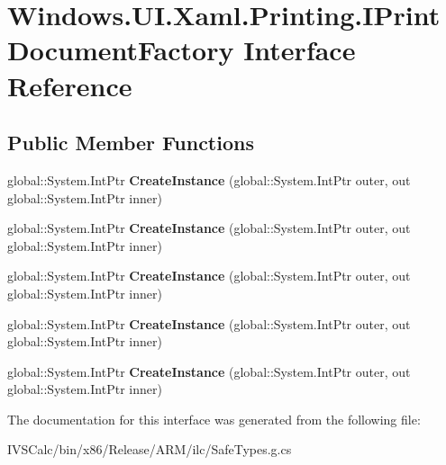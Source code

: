 \hypertarget{interface_windows_1_1_u_i_1_1_xaml_1_1_printing_1_1_i_print_document_factory}{}\section{Windows.\+U\+I.\+Xaml.\+Printing.\+I\+Print\+Document\+Factory Interface Reference}
\label{interface_windows_1_1_u_i_1_1_xaml_1_1_printing_1_1_i_print_document_factory}
\subsection*{Public Member Functions}
\begin{DoxyCompactItemize}
\item 
\mbox{\label{interface_windows_1_1_u_i_1_1_xaml_1_1_printing_1_1_i_print_document_factory_a1629d351c5c4974d5fed7ac601147821}} 
global\+::\+System.\+Int\+Ptr {\bfseries Create\+Instance} (global\+::\+System.\+Int\+Ptr outer, out global\+::\+System.\+Int\+Ptr inner)
\item 
\mbox{\label{interface_windows_1_1_u_i_1_1_xaml_1_1_printing_1_1_i_print_document_factory_a1629d351c5c4974d5fed7ac601147821}} 
global\+::\+System.\+Int\+Ptr {\bfseries Create\+Instance} (global\+::\+System.\+Int\+Ptr outer, out global\+::\+System.\+Int\+Ptr inner)
\item 
\mbox{\label{interface_windows_1_1_u_i_1_1_xaml_1_1_printing_1_1_i_print_document_factory_a1629d351c5c4974d5fed7ac601147821}} 
global\+::\+System.\+Int\+Ptr {\bfseries Create\+Instance} (global\+::\+System.\+Int\+Ptr outer, out global\+::\+System.\+Int\+Ptr inner)
\item 
\mbox{\label{interface_windows_1_1_u_i_1_1_xaml_1_1_printing_1_1_i_print_document_factory_a1629d351c5c4974d5fed7ac601147821}} 
global\+::\+System.\+Int\+Ptr {\bfseries Create\+Instance} (global\+::\+System.\+Int\+Ptr outer, out global\+::\+System.\+Int\+Ptr inner)
\item 
\mbox{\label{interface_windows_1_1_u_i_1_1_xaml_1_1_printing_1_1_i_print_document_factory_a1629d351c5c4974d5fed7ac601147821}} 
global\+::\+System.\+Int\+Ptr {\bfseries Create\+Instance} (global\+::\+System.\+Int\+Ptr outer, out global\+::\+System.\+Int\+Ptr inner)
\end{DoxyCompactItemize}


The documentation for this interface was generated from the following file\+:\begin{DoxyCompactItemize}
\item 
I\+V\+S\+Calc/bin/x86/\+Release/\+A\+R\+M/ilc/Safe\+Types.\+g.\+cs\end{DoxyCompactItemize}
